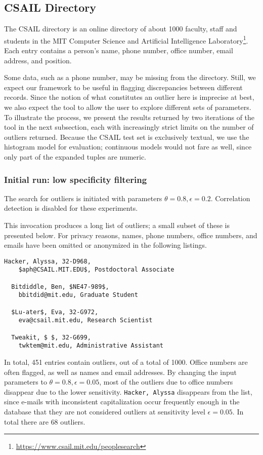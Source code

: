 \subsection{CSAIL Directory}
\label{sec:csail-directory-evaluation}

The CSAIL directory is an online directory of about 1000 faculty, staff and students in the MIT Computer Science and Artificial Intelligence Laboratory\footnote{\url{https://www.csail.mit.edu/peoplesearch}}. Each entry contains a person's name, phone number, office number, email address, and position.

Some data, such as a phone number, may be missing from the directory. Still, we expect our framework to be useful in flagging discrepancies between different records. Since the notion of what constitutes an outlier here is imprecise at best, we also expect the tool to allow the user to explore different sets of parameters. To illustrate the process, we present the results returned by two iterations of the tool in the next subsection, each with increasingly strict limits on the number of outliers returned. Because the CSAIL test set is exclusively textual, we use the histogram model for evaluation; continuous models would not fare as well, since only part of the expanded tuples are numeric.

\subsubsection{Initial run: low specificity filtering}
The search for outliers is initiated with parameters $\theta = 0.8, \epsilon = 0.2$. Correlation detection is disabled for these experiments.

This invocation produces a long list of outliers; a small subset of these is presented below. For privacy reasons, names,  phone numbers, office numbers, and emails have been omitted or anonymized in the following listings.

\begin{lstlisting}[gobble=2]
  Hacker, Alyssa, 32-D968,
    $aph@CSAIL.MIT.EDU$, Postdoctoral Associate

  Bitdiddle, Ben, $NE47-989$,
    bbitdid@mit.edu, Graduate Student

  $Lu-ater$, Eva, 32-G972,
    eva@csail.mit.edu, Research Scientist

  Tweakit, $ $, 32-G699,
    twktem@mit.edu, Administrative Assistant
\end{lstlisting}

In total, 451 entries contain outliers, out of a total of 1000. Office numbers are often flagged, as well as names and email addresses. By changing the input parameters to $\theta = 0.8, \epsilon = 0.05$, most of the outliers due to office numbers disappear due to the lower sensitivity. \lstinline{Hacker, Alyssa} disappears from the list, since e-mails with inconsistent capitalization occur frequently enough in the database that they are not considered outliers at sensitivity level $\epsilon = 0.05$. In total there are $68$ outliers.

